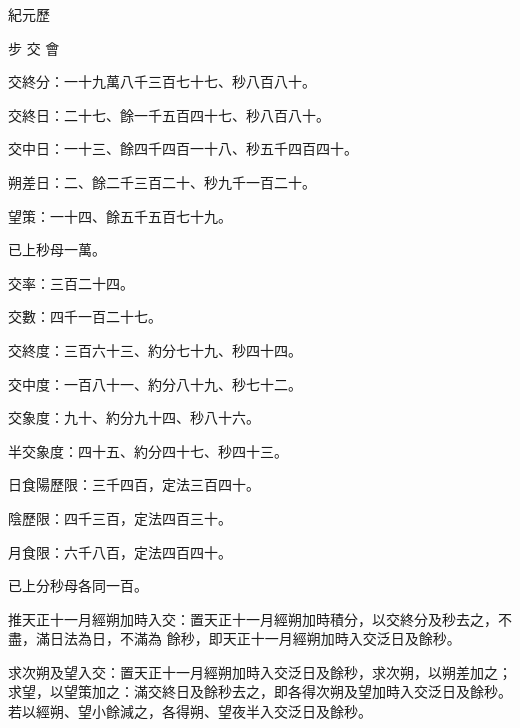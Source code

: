 
\begin{pinyinscope}

 紀元歷



 步
 交
 會



 交終分：一十九萬八千三百七十七、秒八百八十。



 交終日：二十七、餘一千五百四十七、秒八百八十。



 交中日：一十三、餘四千四百一十八、秒五千四百四十。



 朔差日：二、餘二千三百二十、秒九千一百二十。



 望策：一十四、餘五千五百七十九。



 已上秒母一萬。



 交率：三百二十四。



 交數：四千一百二十七。



 交終度：三百六十三、約分七十九、秒四十四。



 交中度：一百八十一、約分八十九、秒七十二。



 交象度：九十、約分九十四、秒八十六。



 半交象度：四十五、約分四十七、秒四十三。



 日食陽歷限：三千四百，定法三百四十。



 陰歷限：四千三百，定法四百三十。



 月食限：六千八百，定法四百四十。



 已上分秒母各同一百。



 推天正十一月經朔加時入交：置天正十一月經朔加時積分，以交終分及秒去之，不盡，滿日法為日，不滿為
 餘秒，即天正十一月經朔加時入交泛日及餘秒。



 求次朔及望入交：置天正十一月經朔加時入交泛日及餘秒，求次朔，以朔差加之；求望，以望策加之：滿交終日及餘秒去之，即各得次朔及望加時入交泛日及餘秒。若以經朔、望小餘減之，各得朔、望夜半入交泛日及餘秒。




\end{pinyinscope}
